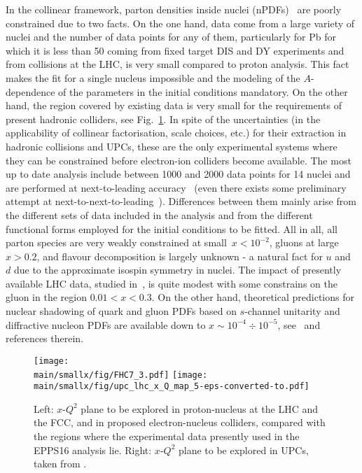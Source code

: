 \documentclass[../report.tex]{subfiles}
\providecommand{\main}{..}
\begin{document}
In the collinear framework, parton densities inside nuclei (nPDFs)~\cite{Paukkunen:2017bbm,armestodis2018} are poorly constrained due to two facts. 
On the one hand, data come from a large variety of nuclei and the number of data points for any of them, particularly for Pb for which it is less than 50 coming from fixed target DIS and DY experiments and from \pPb collisions at the LHC, is very small compared to proton analysis. 
This fact makes the fit for a single nucleus impossible and the modeling of the $A$-dependence of the parameters in the initial conditions mandatory. On the other hand, the region covered by existing data is very small for the requirements of present hadronic colliders, see Fig.~\ref{fig:smallx1}. 
In spite of the uncertainties (in the applicability of collinear factorisation, scale choices, etc.) for their extraction in hadronic collisions and UPCs, these are the only experimental systems where they can be constrained before electron-ion colliders become available. 
The most up to date analysis include between 1000 and 2000 data points for 14 nuclei and are performed at next-to-leading accuracy~\cite{deFlorian:2011fp,Kovarik:2015cma,Eskola:2016oht} (even there exists some preliminary attempt at next-to-next-to-leading~\cite{Khanpour:2016pph}).
Differences between them mainly arise from the different sets of data included in the analysis and from the different functional forms employed for the initial conditions to be fitted. 
All in all, all parton species are very weakly constrained at small~$x<10^{-2}$, gluons at large~$x>0.2$, and flavour decomposition is largely unknown - a natural fact for $u$ and $d$ due to the approximate isospin symmetry in nuclei. 
The impact of presently available LHC data, studied in~\cite{Eskola:2016oht}, is quite modest with some constrains on the gluon in the region $0.01<x<0.3$. 
On the other hand, theoretical predictions for nuclear shadowing of quark and gluon PDFs  based on $s$-channel unitarity and diffractive nucleon PDFs are available down to $x \sim 10^{-4} \div 10^{-5}$, see~\cite{Frankfurt:2011cs,Armesto:2003fi} and references therein. 

\begin{figure}[htb]
\centering
\texttt{[image: \\main/smallx/fig/FHC7\_3.pdf]} \hfill \texttt{[image: \\main/smallx/fig/upc\_lhc\_x\_Q\_map\_5-eps-converted-to.pdf]}
\caption{Left: $x$-$Q^2$ plane to be explored in proton-nucleus at the LHC and the FCC, and in  proposed electron-nucleus colliders, compared with the regions where the experimental data presently used in the EPPS16 analysis \cite{Eskola:2016oht} lie. Right: $x$-$Q^2$ plane to be explored in UPCs, taken from \cite{Baltz:2007kq}.}
\label{fig:smallx1}
\end{figure}
\end{document}
